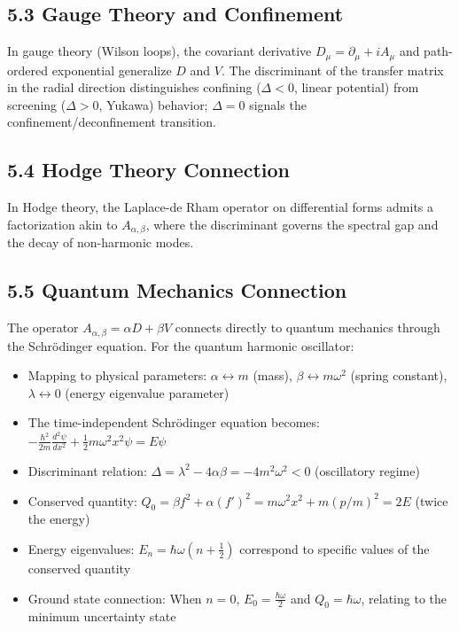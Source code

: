 \documentclass[11pt]{article}
\begin{document}
\subsection{5.3 Gauge Theory and Confinement}
In gauge theory (Wilson loops), the covariant derivative $D_\mu = \partial_\mu + iA_\mu$ and path-ordered exponential generalize $D$ and $V$. The discriminant of the transfer matrix in the radial direction distinguishes confining ($\Delta<0$, linear potential) from screening ($\Delta>0$, Yukawa) behavior; $\Delta=0$ signals the confinement/deconfinement transition.

\subsection{5.4 Hodge Theory Connection}
In Hodge theory, the Laplace-de Rham operator on differential forms admits a factorization akin to $A_{\alpha,\beta}$, where the discriminant governs the spectral gap and the decay of non-harmonic modes.

\subsection{5.5 Quantum Mechanics Connection}
The operator $A_{\alpha,\beta} = \alpha D + \beta V$ connects directly to quantum mechanics through the Schrödinger equation. For the quantum harmonic oscillator:
\begin{itemize}
\item Mapping to physical parameters: $\alpha \leftrightarrow m$ (mass), $\beta \leftrightarrow m\omega^2$ (spring constant), $\lambda \leftrightarrow 0$ (energy eigenvalue parameter)
\item The time-independent Schrödinger equation becomes: $-\frac{\hbar^2}{2m}\frac{d^2\psi}{dx^2} + \frac{1}{2}m\omega^2 x^2 \psi = E\psi$
\item Discriminant relation: $\Delta = \lambda^2 - 4\alpha\beta = -4m^2\omega^2 < 0$ (oscillatory regime)
\item Conserved quantity: $Q_0 = \beta f^2 + \alpha (f')^2 = m\omega^2 x^2 + m (p/m)^2 = 2E$ (twice the energy)
\item Energy eigenvalues: $E_n = \hbar\omega(n + \frac{1}{2})$ correspond to specific values of the conserved quantity
\item Ground state connection: When $n=0$, $E_0 = \frac{\hbar\omega}{2}$ and $Q_0 = \hbar\omega$, relating to the minimum uncertainty state
\end{itemize}
\end{document}
